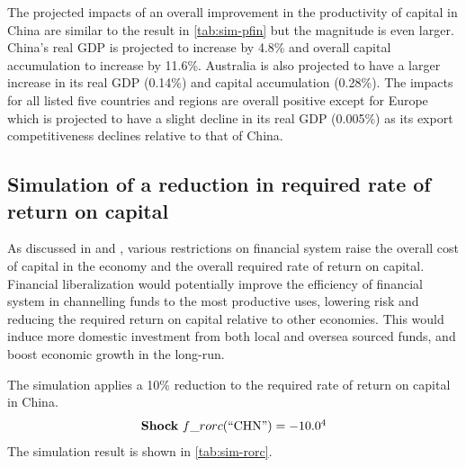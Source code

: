\documentclass[AER]{AEA}
\begin{document}
The projected impacts of an overall 
improvement in the productivity of capital in China are similar to 
the result in \autoref{tab:sim-pfin} but the magnitude is even larger.
China's real GDP is projected to increase by 4.8\% and overall 
capital accumulation to increase by 11.6\%. Australia is also 
projected to have a larger increase in its real GDP (0.14\%) and 
capital accumulation (0.28\%). The impacts for all listed 
five countries and regions are overall positive except for Europe 
which is projected to have a slight decline in its real GDP 
(0.005\%) as its export competitiveness declines relative to 
that of China. \\

\subsection{Simulation of a reduction in required rate of return on capital}
\label{sec:sim1}

As discussed in  and , various 
restrictions on financial system raise the overall cost of capital in the 
economy and the overall required rate of return on capital. Financial 
liberalization would potentially improve the efficiency of financial system 
in channelling funds to the most productive uses, lowering risk and reducing
the required return on capital relative to other economies.
This would induce more domestic investment from both local and oversea sourced 
funds, and boost economic growth in the long-run. 





The simulation applies a 10\% reduction to the required rate of return 
on capital in China.
\begin{equation}
\label{eqn:rorc}
\textrm{\textbf{Shock}}\ f\_rorc(``\textrm{CHN}") = -10.0 \footnotemark[4]
\end{equation}
The simulation result is shown in \autoref{tab:sim-rorc}. 
\end{document}
